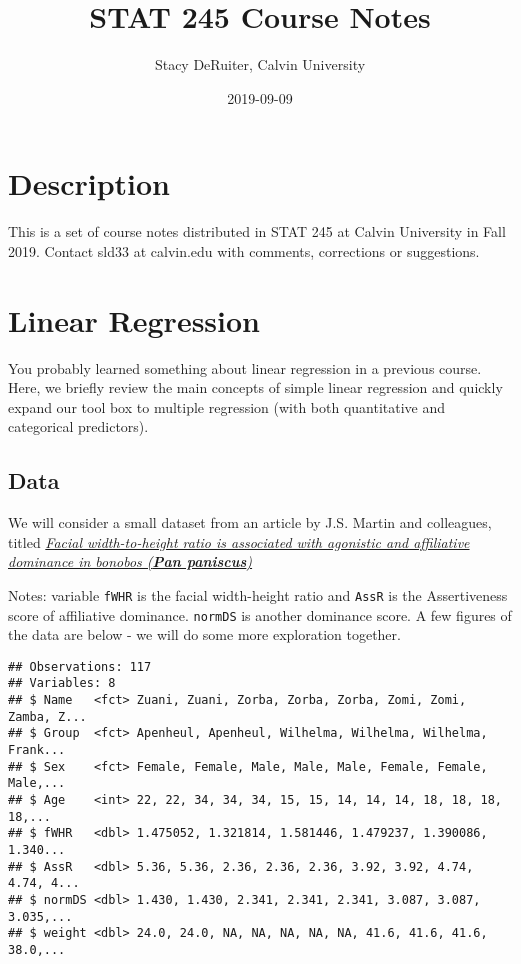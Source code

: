 \documentclass[]{book}
\title{STAT 245 Course Notes}
\author{Stacy DeRuiter, Calvin University}
\date{2019-09-09}
\begin{document}
\maketitle

{
\setcounter{tocdepth}{1}
\tableofcontents
}
\hypertarget{description}{%
\chapter{Description}\label{description}}

This is a set of course notes distributed in STAT 245 at Calvin University in Fall 2019. Contact sld33 at calvin.edu with comments, corrections or suggestions.

\hypertarget{linear-regression}{%
\chapter{Linear Regression}\label{linear-regression}}

You probably learned something about linear regression in a previous course. Here, we briefly review the main concepts of simple linear regression and quickly expand our tool box to multiple regression (with both quantitative and categorical predictors).

\hypertarget{data}{%
\section{Data}\label{data}}

We will consider a small dataset from an article by J.S. Martin and colleagues, titled \href{https://royalsocietypublishing.org/doi/suppl/10.1098/rsbl.2019.0232}{\emph{Facial width-to-height ratio is associated with agonistic and affiliative dominance in bonobos (\textbf{Pan paniscus})}}

Notes: variable \texttt{fWHR} is the facial width-height ratio and \texttt{AssR} is the Assertiveness score of affiliative dominance. \texttt{normDS} is another dominance score. A few figures of the data are below - we will do some more exploration together.

\begin{verbatim}
## Observations: 117
## Variables: 8
## $ Name   <fct> Zuani, Zuani, Zorba, Zorba, Zorba, Zomi, Zomi, Zamba, Z...
## $ Group  <fct> Apenheul, Apenheul, Wilhelma, Wilhelma, Wilhelma, Frank...
## $ Sex    <fct> Female, Female, Male, Male, Male, Female, Female, Male,...
## $ Age    <int> 22, 22, 34, 34, 34, 15, 15, 14, 14, 14, 18, 18, 18, 18,...
## $ fWHR   <dbl> 1.475052, 1.321814, 1.581446, 1.479237, 1.390086, 1.340...
## $ AssR   <dbl> 5.36, 5.36, 2.36, 2.36, 2.36, 3.92, 3.92, 4.74, 4.74, 4...
## $ normDS <dbl> 1.430, 1.430, 2.341, 2.341, 2.341, 3.087, 3.087, 3.035,...
## $ weight <dbl> 24.0, 24.0, NA, NA, NA, NA, NA, 41.6, 41.6, 41.6, 38.0,...
\end{verbatim}
\end{document}
